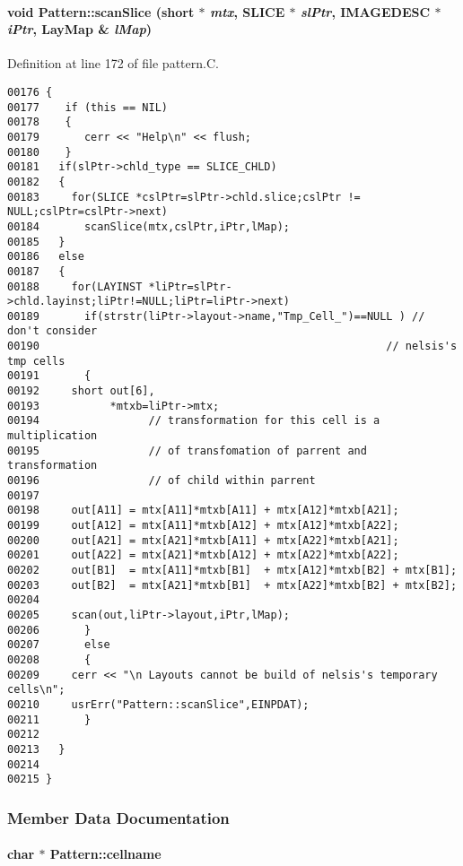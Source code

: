 \paragraph{\setlength{\rightskip}{0pt plus 5cm}void Pattern::scan\-Slice (short $\ast$ {\em mtx}, SLICE $\ast$ {\em sl\-Ptr}, {\bf IMAGEDESC} $\ast$ {\em i\-Ptr}, {\bf Lay\-Map} \& {\em l\-Map})\hspace{0.3cm}{\tt  [private]}}\hfill



Definition at line 172 of file pattern.C.\small\begin{verbatim}00176 {
00177    if (this == NIL)
00178    {
00179       cerr << "Help\n" << flush;
00180    }
00181   if(slPtr->chld_type == SLICE_CHLD)
00182   {
00183     for(SLICE *cslPtr=slPtr->chld.slice;cslPtr != NULL;cslPtr=cslPtr->next)
00184       scanSlice(mtx,cslPtr,iPtr,lMap);
00185   }
00186   else
00187   { 
00188     for(LAYINST *liPtr=slPtr->chld.layinst;liPtr!=NULL;liPtr=liPtr->next)
00189       if(strstr(liPtr->layout->name,"Tmp_Cell_")==NULL ) // don't consider 
00190                                                      // nelsis's tmp cells
00191       {
00192     short out[6],
00193           *mtxb=liPtr->mtx;
00194                 // transformation for this cell is a multiplication
00195                 // of transfomation of parrent and transformation
00196                 // of child within parrent
00197     
00198     out[A11] = mtx[A11]*mtxb[A11] + mtx[A12]*mtxb[A21];
00199     out[A12] = mtx[A11]*mtxb[A12] + mtx[A12]*mtxb[A22];
00200     out[A21] = mtx[A21]*mtxb[A11] + mtx[A22]*mtxb[A21];
00201     out[A22] = mtx[A21]*mtxb[A12] + mtx[A22]*mtxb[A22];
00202     out[B1]  = mtx[A11]*mtxb[B1]  + mtx[A12]*mtxb[B2] + mtx[B1];
00203     out[B2]  = mtx[A21]*mtxb[B1]  + mtx[A22]*mtxb[B2] + mtx[B2];
00204 
00205     scan(out,liPtr->layout,iPtr,lMap);  
00206       }
00207       else
00208       {
00209     cerr << "\n Layouts cannot be build of nelsis's temporary cells\n";
00210     usrErr("Pattern::scanSlice",EINPDAT);
00211       }
00212 
00213   }
00214   
00215 }
\end{verbatim}\normalsize 


\subsubsection{Member Data Documentation}
\label{Pattern_o0}
\paragraph{\setlength{\rightskip}{0pt plus 5cm}char $\ast$ Pattern::cellname\hspace{0.3cm}{\tt  [private]}}\hfill



